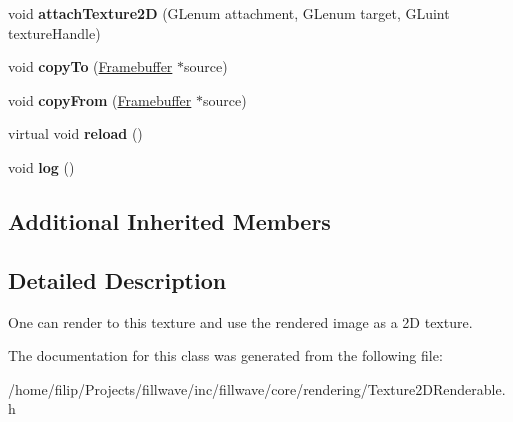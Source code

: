 \begin{DoxyCompactItemize}
\item 
void {\bfseries attach\+Texture2D} (G\+Lenum attachment, G\+Lenum target, G\+Luint texture\+Handle)\hypertarget{classflw_1_1flc_1_1Texture2DRenderable_a4da4b2f4af5bc86a4a9aa58a64443b6e}{}\label{classflw_1_1flc_1_1Texture2DRenderable_a4da4b2f4af5bc86a4a9aa58a64443b6e}

\item 
void {\bfseries copy\+To} (\hyperlink{classflw_1_1flc_1_1Framebuffer}{Framebuffer} $\ast$source)\hypertarget{classflw_1_1flc_1_1Texture2DRenderable_a5291d5c923a6d56bbe82f837b6807fcb}{}\label{classflw_1_1flc_1_1Texture2DRenderable_a5291d5c923a6d56bbe82f837b6807fcb}

\item 
void {\bfseries copy\+From} (\hyperlink{classflw_1_1flc_1_1Framebuffer}{Framebuffer} $\ast$source)\hypertarget{classflw_1_1flc_1_1Texture2DRenderable_add3d4110613cd30046cc060543125e42}{}\label{classflw_1_1flc_1_1Texture2DRenderable_add3d4110613cd30046cc060543125e42}

\item 
virtual void {\bfseries reload} ()\hypertarget{classflw_1_1flc_1_1Texture2DRenderable_a76c9e02cd82b99a1d08960d8923d6319}{}\label{classflw_1_1flc_1_1Texture2DRenderable_a76c9e02cd82b99a1d08960d8923d6319}

\item 
void {\bfseries log} ()\hypertarget{classflw_1_1flc_1_1Texture2DRenderable_a7f4a89eb2e2304656d908d0b0efb8dcb}{}\label{classflw_1_1flc_1_1Texture2DRenderable_a7f4a89eb2e2304656d908d0b0efb8dcb}

\end{DoxyCompactItemize}
\subsection*{Additional Inherited Members}


\subsection{Detailed Description}
One can render to this texture and use the rendered image as a 2D texture. 

The documentation for this class was generated from the following file\+:\begin{DoxyCompactItemize}
\item 
/home/filip/\+Projects/fillwave/inc/fillwave/core/rendering/Texture2\+D\+Renderable.\+h\end{DoxyCompactItemize}
